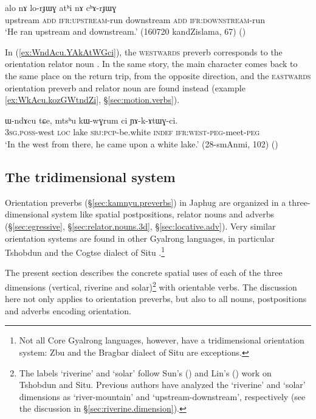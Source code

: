 \begin{exe}
	\ex \label{ex:alo.lorJWG.athi.chArJWG}
	\gll alo nɤ lo-rɟɯɣ atʰi nɤ cʰɤ-rɟɯɣ \\
	upstream \textsc{add} \textsc{ifr}:\textsc{upstream}-run 	downstream \textsc{add} \textsc{ifr}:\textsc{downstream}-run  \\
	\glt `He ran upstream and downstream.' (160720 kandZislama, 67)
()
\end{exe}

In (\ref{ex:WndAcu.YAkAtWGci}), the \textsc{westwards}  preverb corresponds to the orientation relator noun . In the same story, the main character comes back to the same place on the return trip, from the opposite direction, and the \textsc{eastwards} orientation preverb and relator noun are found instead (example \ref{ex:WkAcu.kozGWtndZi}, §\ref{sec:motion.verbs}).


\begin{exe}
	\ex \label{ex:WndAcu.YAkAtWGci}
	\gll ɯ-ndɤcu tɕe, mtsʰu kɯ-wɣrum ci ɲɤ-k-ɤtɯɣ-ci. \\
	\textsc{3sg}.\textsc{poss}-west \textsc{loc} lake \textsc{sbj}:\textsc{pcp}-be.white \textsc{indef} \textsc{ifr}:\textsc{west}-\textsc{peg}-meet-\textsc{peg} \\
	\glt `In the west from there, he came upon a white lake.' (28-smAnmi, 102) ()
\end{exe}

 
\subsection{The tridimensional system} \label{sec:tridimensional.preverb}
Orientation preverbs (§\ref{sec:kamnyu.preverbs}) in Japhug are organized in a three-dimensional system like spatial postpositions, relator nouns and adverbs (§\ref{sec:egressive}, §\ref{sec:relator.nouns.3d}, §\ref{sec:locative.adv}). Very similar orientation systems are found in other Gyalrong languages, in particular Tshobdun \citep{jackson00sidaba} and the Cogtse dialect of Situ \citep{linxr93jiarong, lin02dimension, linyj17space}.\footnote{Not all Core Gyalrong languages, however, have a tridimensional orientation system: Zbu \citep{gong18these} and the Bragbar dialect of Situ \citep{zhangshuya20these} are exceptions.} 

The present section describes the concrete spatial uses of each of the three dimensions (vertical, riverine and solar)\footnote{The labels `riverine' and `solar' follow  Sun's (\citeyear{jackson00sidaba}) and Lin's (\citeyear{lin02dimension}) work on Tshobdun and Situ. Previous authors \citep{linxr93jiarong} have analyzed the `riverine' and `solar' dimensions as `river-mountain' and `upstream-downstream', respectively (see the discussion in §\ref{sec:riverine.dimension}).  } with orientable verbs. The discussion here not only applies to orientation preverbs, but also to all nouns, postpositions and adverbs encoding orientation.

